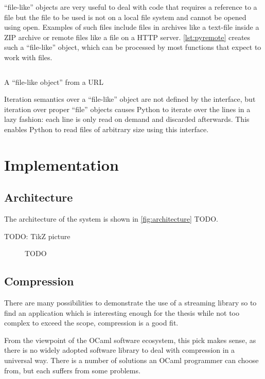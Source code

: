 \documentclass[parskip=half]{scrreprt}
\newcommand\inline[1]{{\addfontfeature{Letters=SmallCaps}#1}}
\begin{document}
\enquote{file-like} objects are very useful to deal with code that requires a
reference to a file but the file to be used is not on a local file system and
cannot be opened using \inline{open}. Examples of such files include files in
archives like a text-file inside a ZIP archive or remote files like a file on a
HTTP server. \autoref{lst:pyremote} creates such a \enquote{file-like}
object, which can be processed by most functions that expect to work with
files.

\begin{listing}[H]
  \inputminted[linenos]{python}{remote.py}
  \caption{A \enquote{file-like object} from a URL}
  \label{lst:pyremote}
\end{listing}

Iteration semantics over a \enquote{file-like} object are not defined by the
interface, but iteration over proper \enquote{file} objects causes Python to
iterate over the lines in a lazy fashion: each line is only read on demand and
discarded afterwards. This enables Python to read files of arbitrary size using
this interface.

\chapter{Implementation}
\label{sec:implementation}

\section{Architecture}
\label{sec:architecture}

The architecture of the system is shown in \autoref{fig:architecture} TODO.

TODO: TikZ picture
\begin{figure}[h]
  \centering
  
  \caption{TODO}
  \label{fig:architecture}
\end{figure}

\section{Compression}
\label{sec:compression}

There are many possibilities to demonstrate the use of a streaming library so
to find an application which is interesting enough for the thesis while not too
complex to exceed the scope, compression is a good fit.

From the viewpoint of the OCaml software ecosystem, this pick makes sense, as
there is no widely adopted software library to deal with compression in a
universal way. There is a number of solutions an OCaml programmer can choose
from, but each suffers from some problems.
\end{document}
